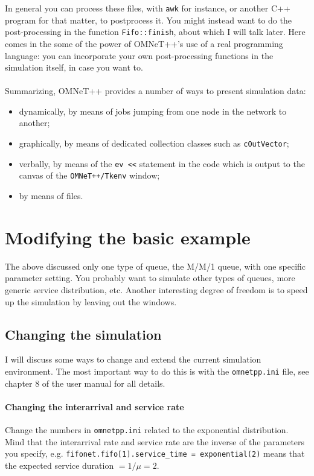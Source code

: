 \documentclass[a4paper]{article}
\begin{document}
In general you can process these files, with \texttt{awk} for instance,
or another C++ program for that matter, to postprocess it. You might
instead want to do the post-processing  in the function
\texttt{Fifo::finish}, about which I will talk later. Here comes in
the some of the power of OMNeT++'s use of   a real programming language:
you can incorporate your own post-processing functions in the
simulation itself, in case you want to.

\paragraph{}
Summarizing, OMNeT++ provides a number of ways to present simulation
data:
\begin{itemize}
\item dynamically, by means of jobs jumping from one node in the
  network to another;
\item graphically, by means of dedicated collection classes such as
  \texttt{cOutVector};
\item verbally, by means of the \texttt{ev <<} statement in the code
  which is output to the  canvas of the \texttt{OMNeT++/Tkenv} window;
\item by means of files.
\end{itemize}

\section{Modifying the basic example}
\label{sec:next-steps}
The above discussed only one type of queue, the M/M/1 queue, with one
specific parameter setting. You
probably want to simulate other types of queues, more generic service
distribution, etc. Another interesting degree of freedom is to speed
up the simulation by leaving out the windows.

\subsection{Changing the  simulation}
\label{sec:changing-basic-mm1}
I will discuss some ways to change and extend the current simulation
environment. The most important way to do this is with the
\texttt{omnetpp.ini} file, see chapter 8 of the user manual for all details.


\paragraph{Changing the interarrival and service rate}
\label{sec:chang-inter-serv}
Change the numbers in \texttt{omnetpp.ini} related to the exponential
distribution. Mind that the interarrival rate and service rate are the
inverse of the parameters you specify, e.g.
\texttt{fifonet.fifo[1].service\_time = exponential(2)} means that the
expected service duration $ = 1/\mu = 2$.
\end{document}
